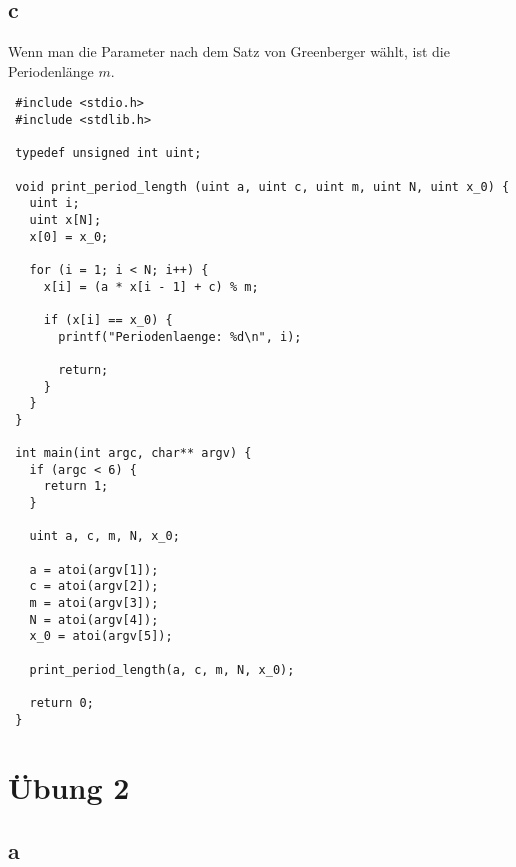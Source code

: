 \documentclass[a4paper,10pt]{article}
\begin{document}
\subsection*{c}

Wenn man die Parameter nach dem Satz von Greenberger wählt, ist die Periodenlänge $m$.

\lstset{language=c}
\begin{lstlisting}
 #include <stdio.h>
 #include <stdlib.h>

 typedef unsigned int uint;

 void print_period_length (uint a, uint c, uint m, uint N, uint x_0) {
   uint i;
   uint x[N];
   x[0] = x_0;
  
   for (i = 1; i < N; i++) {
     x[i] = (a * x[i - 1] + c) % m;
    
     if (x[i] == x_0) {
       printf("Periodenlaenge: %d\n", i);
      
       return;
     }
   }
 }

 int main(int argc, char** argv) {
   if (argc < 6) {
     return 1;
   }
  
   uint a, c, m, N, x_0;
  
   a = atoi(argv[1]);
   c = atoi(argv[2]);
   m = atoi(argv[3]);
   N = atoi(argv[4]);
   x_0 = atoi(argv[5]);
  
   print_period_length(a, c, m, N, x_0);

   return 0;
 }
\end{lstlisting}

\section*{Übung 2}

\subsection*{a}
\end{document}
